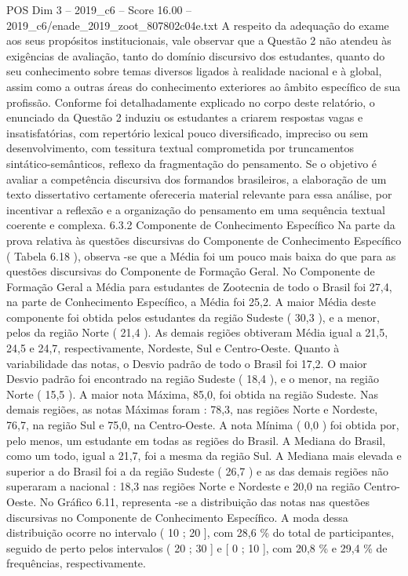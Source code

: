 \begin{textsample}{POS Dim 3 – 2019\_c6 – Score 16.00 – 2019\_c6/enade\_2019\_zoot\_807802c04e.txt}
A respeito da adequação do exame aos seus propósitos institucionais, vale observar que a Questão 2 não atendeu às exigências de avaliação, tanto do domínio discursivo dos estudantes, quanto do seu conhecimento sobre temas diversos ligados à realidade nacional e à global, assim como a outras áreas do conhecimento exteriores ao âmbito específico de sua profissão.
Conforme foi detalhadamente explicado no corpo deste relatório, o enunciado da Questão 2 induziu os estudantes a criarem respostas vagas e insatisfatórias, com repertório lexical pouco diversificado, impreciso ou sem desenvolvimento, com tessitura textual comprometida por truncamentos sintático-semânticos, reflexo da fragmentação do pensamento.
Se o objetivo é avaliar a competência discursiva dos formandos brasileiros, a elaboração de um texto dissertativo certamente ofereceria material relevante para essa análise, por incentivar a reflexão e a organização do pensamento em uma sequência textual coerente e complexa. 6.3.2 Componente de Conhecimento Específico Na parte da prova relativa às questões discursivas do Componente de Conhecimento Específico ( Tabela 6.18 ), observa -se que a Média foi um pouco mais baixa do que para as questões discursivas do Componente de Formação Geral.
No Componente de Formação Geral a Média para estudantes de Zootecnia de todo o Brasil foi 27,4, na parte de Conhecimento Específico, a Média foi 25,2.
A maior Média deste componente foi obtida pelos estudantes da região Sudeste ( 30,3 ), e a menor, pelos da região Norte ( 21,4 ).
As demais regiões obtiveram Média igual a 21,5, 24,5 e 24,7, respectivamente, Nordeste, Sul e Centro-Oeste.
Quanto à variabilidade das notas, o Desvio padrão de todo o Brasil foi 17,2.
O maior Desvio padrão foi encontrado na região Sudeste ( 18,4 ), e o menor, na região Norte ( 15,5 ).
A maior nota Máxima, 85,0, foi obtida na região Sudeste.
Nas demais regiões, as notas Máximas foram : 78,3, nas regiões Norte e Nordeste, 76,7, na região Sul e 75,0, na Centro-Oeste.
A nota Mínima ( 0,0 ) foi obtida por, pelo menos, um estudante em todas as regiões do Brasil.
A Mediana do Brasil, como um todo, igual a 21,7, foi a mesma da região Sul.
A Mediana mais elevada e superior a do Brasil foi a da região Sudeste ( 26,7 ) e as das demais regiões não superaram a nacional : 18,3 nas regiões Norte e Nordeste e 20,0 na região Centro-Oeste.
No Gráfico 6.11, representa -se a distribuição das notas nas questões discursivas no Componente de Conhecimento Específico.
A moda dessa distribuição ocorre no intervalo ( 10 ; 20 ], com 28,6 \% do total de participantes, seguido de perto pelos intervalos ( 20 ; 30 ] e [ 0 ; 10 ], com 20,8 \% e 29,4 \% de frequências, respectivamente.

\end{textsample}
